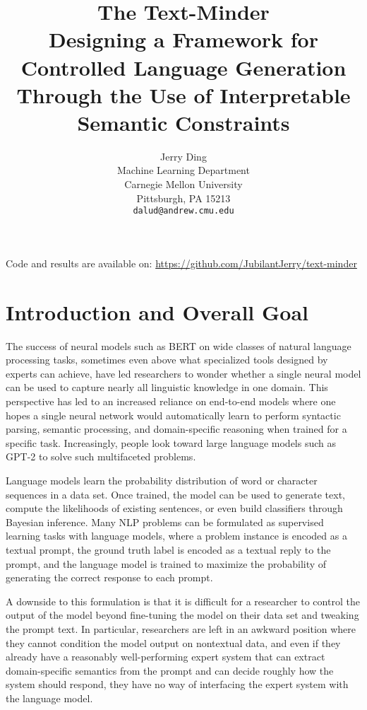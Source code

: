 \documentclass{article}
\title{The Text-Minder\\\large Designing a Framework for Controlled Language Generation\\
Through the Use of Interpretable Semantic Constraints}
\author{%
  Jerry Ding\\
  Machine Learning Department\\
  Carnegie Mellon University\\
  Pittsburgh, PA 15213 \\
  \texttt{dalud@andrew.cmu.edu}
}
\numberwithin{equation}{section}
\begin{document}
\maketitle

\vspace{-1em}

\begin{center}
Code and results are available on: \url{https://github.com/JubilantJerry/text-minder}
\end{center}

\section{Introduction and Overall Goal}

The success of neural models such as BERT \cite{bert} on wide classes of natural language processing tasks, sometimes even above what specialized tools designed by experts can achieve, have led researchers to wonder whether a single neural model can be used to capture nearly all linguistic knowledge in one domain. This perspective has led to an increased reliance on end-to-end models where one hopes a single neural network would automatically learn to perform syntactic parsing, semantic processing, and domain-specific reasoning when trained for a specific task. Increasingly, people look toward large language models such as GPT-2 \cite{gpt2} to solve such multifaceted problems.

Language models learn the probability distribution of
word or character sequences in a data set. Once trained, the model can be used to generate text, compute the likelihoods of existing sentences, or even build classifiers through Bayesian inference. Many NLP problems can be formulated as supervised learning tasks with language models, where a problem instance is encoded as a textual prompt, the ground truth label is encoded as a textual reply to the prompt, and the language model is trained to maximize the probability of generating the correct response to each prompt.

A downside to this formulation is that it is difficult for a researcher to control the output of the model beyond fine-tuning the model on their data set and tweaking the prompt text. In particular, researchers are left in an awkward position where they cannot condition the model output on nontextual data, and even if they already have a reasonably well-performing expert system that can extract domain-specific semantics from the prompt and can decide roughly how the system should respond, they have no way of interfacing the expert system with the language model.
\end{document}
